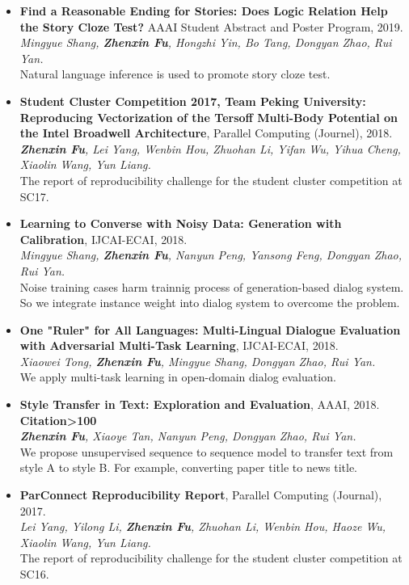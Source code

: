 \documentclass[letterpaper]{article}
\begin{document}
\begin{itemize}
\item \textbf{Find a Reasonable Ending for Stories: Does Logic Relation Help the Story Cloze Test?} AAAI Student Abstract and Poster Program, 2019. \\
{\it Mingyue Shang, \textbf{Zhenxin Fu}, Hongzhi Yin, Bo Tang, Dongyan Zhao, Rui Yan.} \\
Natural language inference is used to promote story cloze test.

\item \textbf{Student Cluster Competition 2017, Team Peking University: Reproducing Vectorization of the Tersoff Multi-Body Potential on the Intel Broadwell Architecture}, Parallel Computing (Journel), 2018. \\
{\it \textbf{Zhenxin Fu}, Lei Yang, Wenbin Hou, Zhuohan Li, Yifan Wu, Yihua Cheng, Xiaolin Wang, Yun Liang.} \\
  The report of reproducibility challenge for the student cluster competition at SC17.

\item \textbf{Learning to Converse with Noisy Data: Generation with Calibration}, IJCAI-ECAI, 2018. \\
  {\it Mingyue Shang, \textbf{Zhenxin Fu}, Nanyun Peng, Yansong Feng, Dongyan Zhao, Rui Yan.}  \\
  Noise training cases harm trainnig process of generation-based dialog system. So we integrate instance weight into dialog system to overcome the problem.

\item \textbf{One "Ruler" for All Languages: Multi-Lingual Dialogue Evaluation with Adversarial Multi-Task Learning}, IJCAI-ECAI, 2018. \\
  {\it Xiaowei Tong, \textbf{Zhenxin Fu}, Mingyue Shang, Dongyan Zhao, Rui Yan.} \\
  We apply multi-task learning in open-domain dialog evaluation.

\item \textbf{Style Transfer in Text: Exploration and Evaluation}, AAAI, 2018. \textbf{Citation>100}\\
  {\it \textbf{Zhenxin Fu}, Xiaoye Tan, Nanyun Peng, Dongyan Zhao, Rui Yan.} \\
  We propose unsupervised sequence to sequence model to transfer text from style A to style B. For example, converting paper title to news title.
  
\item \textbf{ParConnect Reproducibility Report}, Parallel Computing (Journal), 2017.\\
  {\it Lei Yang, Yilong Li, \textbf{Zhenxin Fu}, Zhuohan Li, Wenbin Hou, Haoze Wu, Xiaolin Wang, Yun Liang.} \\
  The report of reproducibility challenge for the student cluster competition at SC16.
\end{itemize}
\end{document}
